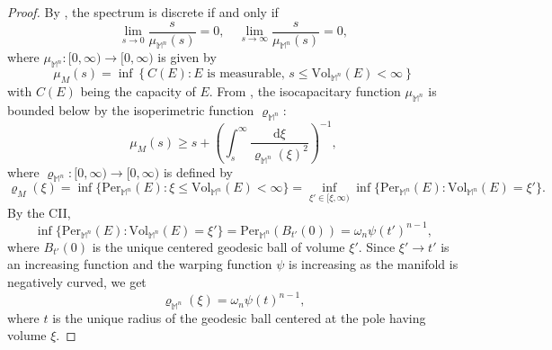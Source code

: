 \documentclass[a4paper,11pt,reqno]{amsart}
\theoremstyle{plain}
\numberwithin{equation}{section} \allowdisplaybreaks
\newcommand{\m}{\mathbb{M}^n}
\newcommand{\uv}{\omega_n}
\begin{document}
\begin{proof}
    By \cite[Theorem~3.1]{CM}, the spectrum is discrete if and only if
    \begin{equation*}
        \lim_{s \to 0}\frac{s}{\mu_{\m}(s)}=0,\quad \lim_{s\to \infty}\frac{s}{\mu_{\m}(s)}=0,
    \end{equation*}
where $\mu_{\m}: [0,\infty)\to [0,\infty)$ is given by
\begin{equation*}
    \mu_M(s)=\inf\left\{C(E): E\,\, \text{is measurable},\,s\leq \text{Vol}_{\m}(E)<\infty\right\}
\end{equation*}
with $C(E)$ being the capacity of $E$. From \cite[Equation~3.7, Section~3]{CM}, the isocapacitary function $\mu_{\m}$ is bounded below by the isoperimetric function $\varrho_{\m}$:
\begin{equation}\label{lower bound}
    \mu_M(s)\geq s+\left(\int_s^{\infty}\frac{\mathrm{d}\xi}{\varrho_{\m}(\xi)^2}\right)^{-1},
\end{equation}
where $\varrho_{\m}: [0,\infty)\to [0,\infty)$ is defined by
\begin{equation*}
    \varrho_M(\xi)=\inf\{\text{Per}_{\m}(E): \xi \leq \text{Vol}_{\m}(E)<\infty\}=\inf_{\xi'\in[\xi,\infty)}\inf\{\text{Per}_{\m}(E):\text{Vol}_{\m}(E)=\xi' \}.
\end{equation*}
By the CII, 
\begin{equation*}
    \inf\{\text{Per}_{\m}(E):\text{Vol}_{\m}(E)=\xi' \}=\text{Per}_{\m}(B_{t'}(0))= \uv\psi(t')^{n-1},
\end{equation*}
where $B_{t'}(0)$ is the unique centered geodesic ball of volume $\xi'$. Since $\xi'\to t'$ is an increasing function and the warping function $\psi$ is increasing as the manifold is negatively curved, we get
\begin{equation*}
    \varrho_{\m}(\xi)=\uv\psi(t)^{n-1},
\end{equation*}
    where $t$ is the unique radius of the geodesic ball centered at the pole having volume $\xi$.


\end{proof}
\end{document}

